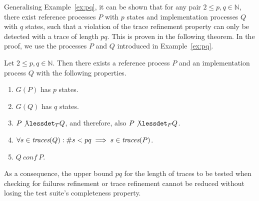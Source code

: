 %
Generalising Example~\ref{ex:pq}, it can be shown that for any pair
$2\le p,q \in\mathbb{N}$,
there exist reference processes $P$ with $p$ states
and implementation processes $Q$ with $q$ states, such that
a violation of the trace refinement property
can only be detected with a trace of length $pq$. This is proven in the following
theorem. In the proof, we use the processes $P$ and $Q$ introduced in Example~\ref{ex:pq}. 

\begin{theorem}\label{th:maxtracelen}
Let $2\le p,q \in\mathbb{N}$. Then there exists a reference process $P$ and an
implementation process $Q$ with the following properties.
\begin{enumerate}
\item $G(P)$ has $p$ states.
\item $G(Q)$ has $q$ states.
\item $P\not\lessdet_T Q$, and therefore, also $P\not\lessdet_F Q$.
\item $\forall s\in\text{\it traces}(Q): \#s < pq\implies s\in\text{\it traces}(P)$.
\item $Q\ conf\ P$.
\end{enumerate}
As a consequence, the upper bound $pq$ for the length of traces to be tested when checking for failures refinement or trace refinement 
cannot be reduced without losing the test suite's completeness property.
\end{theorem}
